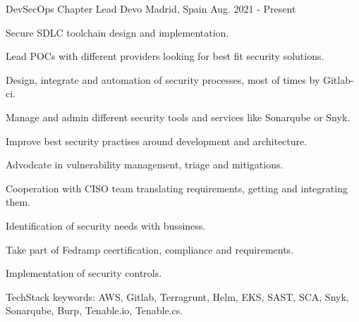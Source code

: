
\begin{cventries}

  \cventry
    {DevSecOps Chapter Lead} %
    {Devo} %
    {Madrid, Spain} %
    {Aug. 2021 - Present} %
    {
      \begin{cvitems} %
        \item {Secure SDLC toolchain design and implementation.}
        \item {Lead POCs with different providers looking for best fit security solutions.}
        \item {Design, integrate and automation of security processes, most of times by Gitlab-ci.}
        \item {Manage and admin different security tools and services like Sonarqube or Snyk.}
        \item {Improve best security practises around development and architecture.}
        \item {Advodcate in vulnerability management, triage and mitigations.}
        \item {Cooperation with CISO team translating requirements, getting and integrating them.}
        \item {Identification of security needs with bussiness.}
        \item {Take part of Fedramp ceertification, compliance and requirements.}
        \item {Implementation of security controls.}
        \item {TechStack keywords: AWS, Gitlab, Terragrunt, Helm, EKS, SAST, SCA, Snyk, Sonarqube, Burp, Tenable.io, Tenable.cs. }
      \end{cvitems}
    }


\end{cventries}
